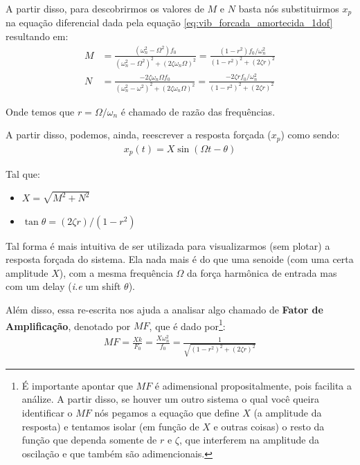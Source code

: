 \documentclass{article}
\newcommand{\n}{\nonumber \\ }
\begin{document}
            A partir disso, para descobrirmos os valores de $M$ e $N$ basta nós substituirmos $x_p$ na equação diferencial dada pela equação \ref{eq:vib_forcada_amortecida_1dof} resultando em:
            \begin{align}
                M &= \frac{(\omega_n^2 - \Omega^2)f_0}{(\omega_n^2 - \Omega^2)^2 + (2\zeta \omega_n\Omega)^2} = \frac{(1 - r^2) f_0/\omega_n^2}{(1 - r^2)^2 + (2 \zeta r)^2} \n
                N &= \frac{-2\zeta \omega_n \Omega f_0}{(\omega_n^2 - \omega^2)^2 + (2\zeta\omega_n\Omega)^2} = \frac{-2\zeta r f_0/\omega_n^2}{(1 - r^2)^2 + (2\zeta r)^2}
            \end{align}

            Onde temos que $r = \Omega / \omega_n$ é chamado de razão das frequências.

            A partir disso, podemos, ainda, reescrever a resposta forçada ($x_p$) como sendo:
            \begin{align}
                x_p(t) = X\sin(\Omega t - \theta)
            \end{align}

            Tal que:
            \begin{itemize}
                \item $X = \sqrt{M^2 + N^2}$
                \item $\tan{\theta} = (2\zeta r)/(1-r^2)$
            \end{itemize}

            Tal forma é mais intuitiva de ser utilizada para visualizarmos (sem plotar) a resposta forçada do sistema. Ela nada mais é do que uma senoide (com uma certa amplitude $X$), com a mesma
            frequência $\Omega$ da força harmônica de entrada mas com um delay (\emph{i.e} um shift $\theta$).

            Além disso, essa re-escrita nos ajuda a analisar algo chamado de \textbf{Fator de Amplificação}, denotado por \textbf{$MF$}, que é dado por\footnote{É importante apontar que $MF$ é
            adimensional propositalmente, pois facilita a análize. A partir disso, se houver um outro sistema o qual você queira identificar o $MF$ nós pegamos a equação que define $X$ (a amplitude da
            resposta) e tentamos isolar (em função de $X$ e outras coisas) o resto da função que dependa somente de $r$ e $\zeta$, que interferem na amplitude da oscilação e que também são adimencionais.}:
            \begin{align}
                MF = \frac{Xk}{F_0} = \frac{X\omega_n^2}{f_0} = \frac{1}{\sqrt{(1 - r^2)^2 + (2\zeta r)^2}}\label{eq:fator_de_amplificacao}
            \end{align}
\end{document}
